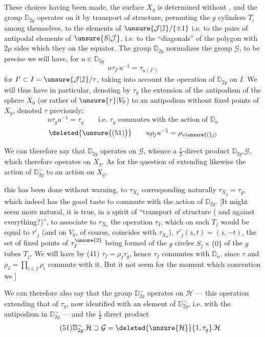 These choices having been made, the surface $X_g$ is determined without
, and the group $\mathbb D_{2g}$ operates on it by transport of
structure, permuting the $g$ cylinders $T_i$ among themselves,
 to the elements of
$\unsure{\mathcal J|\mathbb J}/\{\pm1\}$ i.e.
to the pairs of antipodal elements of $\unsure{S|\mathcal J}$,
i.e. to the ``diagonals'' of the polygon with $2\mu$ sides
which they 
on the equator. The group $\mathbb D_{2g}$ normalizes
 the group $\mathcal G$, to be precise
we will have, for $u\in\mathbb D_{2g}$
\[
\tag{49}
u\tau_{I'}u^{-1}=\tau_{u(I')}
\]
for $I'\subset I=\unsure{\mathcal J|\mathbb J}/\tau$, taking into account
the operation of $\mathbb D_{2g}$ on $I$. We will thus have in
particular, denoting by $\tau_g$\inserted{$=\tau_\varnothing$}
the extension  of the antipodism of the sphere $X_0$
(or rather of $\unsure{\tau}\vert V_0$) to an antipodism
without fixed points of $X_g$, denoted $\tau$ previously:
\[
\tag{50}
u\tau_g u^{-1}=\tau_g
\qquad\text{i.e. $\tau_g$ commutes with the action of $\mathbb D_n$}
\]
\[
\deleted{\unsure{(51)}}\qquad
u\rho_j u^{-1}=\rho_{u\unsure{(}j)}
\]

We can therefore say that $\mathbb D_{2g}$ operates on $\mathcal G$,
whence a $\frac12$-direct product $\mathbb D_{2g}.\mathcal G$,
which therefore operates on $X_g$.
As for the question of extending likewise
the action  of $\mathbb D_{2g}^\sim$
  to an action on $X_g$,



this has been done without warning, to $\tau_{X_0}$ corresponding
naturally $\tau_{X_g}=\tau_g$, which indeed has the good taste
to commute with the action of $\mathbb D_{2g}$.
[It might seem more natural, it is true, in a
spirit of ``transport of structure ( and against
everything?)'', to associate to $\tau_{X_0}$ the operation
$\tau_I$, which on
each $T_j$ would be equal to $\tau'_j$
(and on $V_0$, of course, coincides with $\tau_{X_0}$),
$\tau'_j(z,t)=(z,-t)$,
 the set of fixed points of $\tau_I^{\unsure{2}}$
being formed of the $g$  circles $S_j\times\{0\}$
of the $g$ tubes $T_j$. We will have by (41)
$\tau_I=\rho_I\tau_g$, hence $\tau_I$ commutes
 with $\mathbb D_n$, since $\tau$ and
$\rho_I=\prod_{i\in I}\rho_i$ commute with it.
But it  not seem  for the moment
which convention we ]

We can therefore also say that the group $\mathbb D_{2g}^\sim$
operates on $\mathcal H$ --- this operation extending that
of $\tau_g$, now identified with an
element of $\mathbb D_{2g}^\sim$, i.e. with the antipodism in
$\mathbb D_{2g}^\sim$ --- and the $\frac12$ direct product
\[
\tag{51}
\mathbb D_{2g}^\sim.\mathcal H\supset\mathcal G
=\deleted{\unsure{\mathcal H}}\{1,\tau_g\}.\mathcal H
\]

